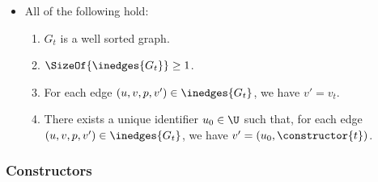 \begin{definition}
\begin{itemize}
    \item All of the following hold:
      \begin{enumerate}
        \item $G_t$ is a well sorted graph.
        \item $\SizeOf{\inedges{G_t}} \geq 1$.
        \item For each edge $(u, v, p, v') \in \inedges{G_t}$, we have $v' = v_t$.
        \item There exists a unique identifier $u_0 \in \U$ such that,
          for each edge $(u, v, p, v') \in \inedges{G_t}$,
          we have $v' = (u_0, \constructor{t})$.
      \end{enumerate}
  \end{itemize}
\end{definition}


\subsubsection{Constructors}

